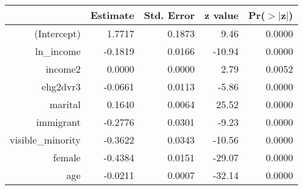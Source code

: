 \begin{table}[ht]
\centering
\begin{tabular}{rrrrr}
  \hline
 & Estimate & Std. Error & z value & Pr($>$$|$z$|$) \\ 
  \hline
(Intercept) & 1.7717 & 0.1873 & 9.46 & 0.0000 \\ 
  ln\_income & -0.1819 & 0.0166 & -10.94 & 0.0000 \\ 
  income2 & 0.0000 & 0.0000 & 2.79 & 0.0052 \\ 
  ehg2dvr3 & -0.0661 & 0.0113 & -5.86 & 0.0000 \\ 
  marital & 0.1640 & 0.0064 & 25.52 & 0.0000 \\ 
  immigrant & -0.2776 & 0.0301 & -9.23 & 0.0000 \\ 
  visible\_minority & -0.3622 & 0.0343 & -10.56 & 0.0000 \\ 
  female & -0.4384 & 0.0151 & -29.07 & 0.0000 \\ 
  age & -0.0211 & 0.0007 & -32.14 & 0.0000 \\ 
   \hline
\end{tabular}
\end{table}
